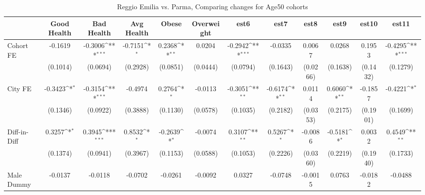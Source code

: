\begin{table}[htbp]\centering
\def\sym#1{\ifmmode^{#1}\else\(^{#1}\)\fi}
\caption{Reggio Emilia vs. Parma, Comparing changes for Age50 cohorts}
\begin{tabular}{l*{11}{c}}
\toprule
            &\multicolumn{1}{c}{Good Health}&\multicolumn{1}{c}{Bad Health}&\multicolumn{1}{c}{Avg Health}&\multicolumn{1}{c}{Obese}&\multicolumn{1}{c}{Overweight}&\multicolumn{1}{c}{est6}&\multicolumn{1}{c}{est7}&\multicolumn{1}{c}{est8}&\multicolumn{1}{c}{est9}&\multicolumn{1}{c}{est10}&\multicolumn{1}{c}{est11}\\
\midrule
Cohort FE   &     -0.1619         &     -0.3006\sym{***}&     -0.7151\sym{*}  &      0.2368\sym{**} &      0.0204         &     -0.2942\sym{***}&     -0.0335         &      0.0067         &      0.0268         &      0.1953         &     -0.4295\sym{***}\\
            &    (0.1014)         &    (0.0694)         &    (0.2928)         &    (0.0851)         &    (0.0444)         &    (0.0794)         &    (0.1643)         &    (0.0266)         &    (0.1638)         &    (0.1432)         &    (0.1279)         \\
\addlinespace
City FE     &     -0.3423\sym{*}  &     -0.3154\sym{***}&     -0.4974         &      0.2764\sym{*}  &     -0.0113         &     -0.3051\sym{**} &     -0.6174\sym{**} &      0.0114         &      0.6060\sym{**} &     -0.1857         &     -0.4221\sym{*}  \\
            &    (0.1346)         &    (0.0922)         &    (0.3888)         &    (0.1130)         &    (0.0578)         &    (0.1035)         &    (0.2182)         &    (0.0353)         &    (0.2175)         &    (0.1901)         &    (0.1699)         \\
\addlinespace
Diff-in-Diff&      0.3257\sym{*}  &      0.3945\sym{***}&      0.8532\sym{*}  &     -0.2639\sym{*}  &     -0.0074         &      0.3107\sym{**} &      0.5267\sym{*}  &     -0.0086         &     -0.5181\sym{*}  &      0.0032         &      0.4549\sym{**} \\
            &    (0.1374)         &    (0.0941)         &    (0.3967)         &    (0.1153)         &    (0.0588)         &    (0.1053)         &    (0.2226)         &    (0.0360)         &    (0.2219)         &    (0.1940)         &    (0.1733)         \\
\addlinespace
Male Dummy  &     -0.0137         &     -0.0118         &     -0.0702         &     -0.0261         &     -0.0092         &      0.0327         &     -0.0748         &     -0.0015         &      0.0763         &     -0.0182         &     -0.0488         \\

\end{tabular}
\end{table}

